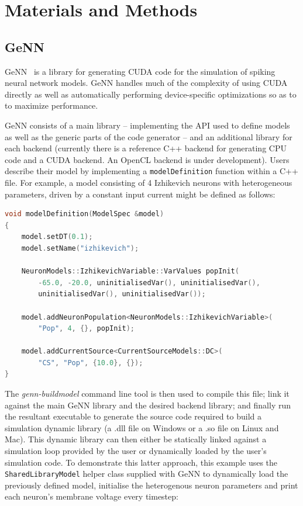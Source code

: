 \documentclass[utf8]{frontiersSCNS} %
\begin{document}
\section{Materials and Methods}
\subsection{GeNN}
\label{sec:methods/genn}
GeNN~\citep{Yavuz2016} is a library for generating CUDA code for the simulation of spiking neural network models.
GeNN handles much of the complexity of using CUDA directly as well as automatically performing device-specific optimizations so as to to maximize performance.

GeNN consists of a main library -- implementing the API used to define models as well as the generic parts of the code generator -- and an additional library for each backend (currently there is a reference C++ backend for generating CPU code and a CUDA backend. An OpenCL backend is under development).
Users describe their model by implementing a \lstinline{modelDefinition} function within a C++ file. For example, a model consisting of 4 Izhikevich neurons with heterogeneous parameters, driven by a constant input current might be defined as follows:
%
\begin{lstlisting}[language=C++]
void modelDefinition(ModelSpec &model)
{
    model.setDT(0.1);
    model.setName("izhikevich");
    
    NeuronModels::IzhikevichVariable::VarValues popInit(
        -65.0, -20.0, uninitialisedVar(), uninitialisedVar(),
        uninitialisedVar(), uninitialisedVar());
    
    model.addNeuronPopulation<NeuronModels::IzhikevichVariable>(
        "Pop", 4, {}, popInit);

    model.addCurrentSource<CurrentSourceModels::DC>(
        "CS", "Pop", {10.0}, {});
}
\end{lstlisting}
%
The \emph{genn-buildmodel} command line tool is then used to compile this file; link it against the main GeNN library and the desired backend library; and finally run the resultant executable to generate the source code required to build a simulation dynamic library (a .dll file on Windows or a .so file on Linux and Mac).
This dynamic library can then either be statically linked against a simulation loop provided by the user or dynamically loaded by the user's simulation code.
To demonstrate this latter approach, this example uses the \lstinline{SharedLibraryModel} helper class supplied with GeNN to dynamically load the previously defined model, initialise the heterogenous neuron parameters and print each neuron's membrane voltage every timestep: 
\end{document}
